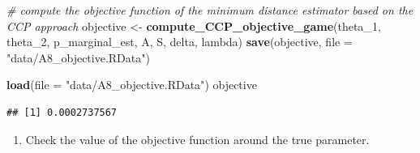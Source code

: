 \documentclass[]{book}
\newenvironment{Shaded}{\begin{snugshade}}{\end{snugshade}}
\newcommand{\KeywordTok}[1]{\textcolor[rgb]{0.13,0.29,0.53}{\textbf{#1}}}
\newcommand{\DataTypeTok}[1]{\textcolor[rgb]{0.13,0.29,0.53}{#1}}
\newcommand{\DecValTok}[1]{\textcolor[rgb]{0.00,0.00,0.81}{#1}}
\newcommand{\StringTok}[1]{\textcolor[rgb]{0.31,0.60,0.02}{#1}}
\newcommand{\CommentTok}[1]{\textcolor[rgb]{0.56,0.35,0.01}{\textit{#1}}}
\newcommand{\NormalTok}[1]{#1}
\providecommand{\tightlist}{%
  \setlength{\itemsep}{0pt}\setlength{\parskip}{0pt}}
\begin{document}
\begin{Shaded}
\begin{Highlighting}[]
\CommentTok{# compute the objective function of the minimum distance estimator based on the CCP approach}
\NormalTok{objective <-}\StringTok{ }\KeywordTok{compute_CCP_objective_game}\NormalTok{(theta_}\DecValTok{1}\NormalTok{, theta_}\DecValTok{2}\NormalTok{, p_marginal_est, A, S, delta, lambda)}
\KeywordTok{save}\NormalTok{(objective, }\DataTypeTok{file =} \StringTok{"data/A8_objective.RData"}\NormalTok{)}
\end{Highlighting}
\end{Shaded}

\begin{Shaded}
\begin{Highlighting}[]
\KeywordTok{load}\NormalTok{(}\DataTypeTok{file =} \StringTok{"data/A8_objective.RData"}\NormalTok{)}
\NormalTok{objective}
\end{Highlighting}
\end{Shaded}

\begin{verbatim}
## [1] 0.0002737567
\end{verbatim}

\begin{enumerate}
\def\labelenumi{\arabic{enumi}.}
\setcounter{enumi}{2}
\tightlist
\item
  Check the value of the objective function around the true parameter.
\end{enumerate}
\end{document}
